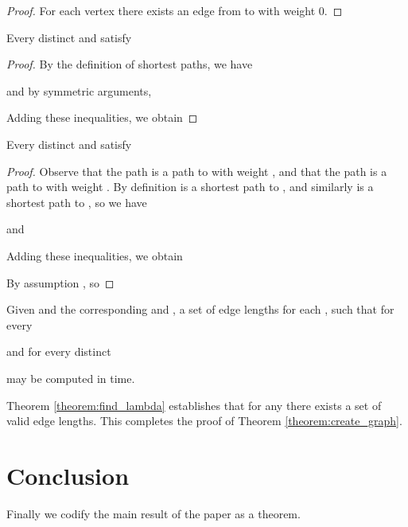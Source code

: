 \documentclass{llncs}
\begin{document}
\begin{proof}
For each vertex  there exists an edge from  to  with weight 0.
\end{proof}

\begin{lemma}
Every distinct  and  satisfy 
\end{lemma}
\begin{proof}
By the definition of shortest paths, we have

\noindent and by symmetric arguments,

\noindent Adding these inequalities, we obtain

\end{proof}

\begin{lemma}
Every distinct  and  satisfy 
\end{lemma}

\begin{proof}
Observe that the path  is a path to  with weight , and that the path  is a path to  with weight .  By definition  is a shortest path to , and similarly  is a shortest path to , so we have

\noindent and

\noindent Adding these inequalities, we obtain

\noindent By assumption , so

\end{proof}


\begin{theorem}
\label{theorem:find_lambda}
Given  and the corresponding  and , a set  of edge lengths  for each ,  such that for every 

\noindent and for every distinct 


\noindent may be computed in  time.
\end{theorem}

Theorem \ref{theorem:find_lambda} establishes that for any  there exists a set  of valid edge lengths.  This completes the proof of Theorem \ref{theorem:create_graph}.

\section{Conclusion}
\label{section:conclusion}

Finally we codify the main result of the paper as a theorem.
\end{document}
